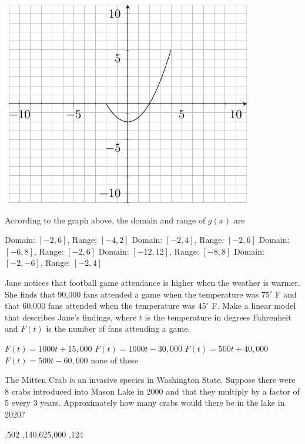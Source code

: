 \documentclass[11pt]{article}
\begin{document}
\begin{questions}
\begin{multiplechoice}{5}
\begin{minipage}{\linewidth}%
\centering
\makebox[\linewidth]{}
\includegraphics{exam1graph2.pdf}
\label{graph2exam1}%
\end{minipage}
According to the graph above, the domain and range of $g(x)$ are
\begin{answers}{2}
\ans Domain: $[-2,6]$, Range: $[-4,2]$
\ans Domain: $[-2,4]$, Range: $[-2,6]$
\ans Domain: $[-6,8]$, Range: $[-2,6]$
\ans Domain: $[-12,12]$, Range: $[-8,8]$
\ans Domain: $[-2,-6]$, Range: $[-2,4]$
\end{answers}



\question Jane notices that football game attendance is higher when the weather is warmer.  She finds that 90,000 fans attended a game when the temperature was $75^\circ$ F and that 60,000 fans attended when the temperature was $45^\circ$ F.  Make a linear model that describes Jane's findings, where $t$ is the temperature in degrees Fahrenheit and $F(t)$ is the number of fans attending a game.
\begin{answers}{3}
\ans $F(t) = 1000t+15,000$
\ans $F(t) = 1000t-30,000$
\ans $F(t) = 500t+40,000$
\ans $F(t) = 500t - 60,000$
\ans none of these
\end{answers}

\question The Mitten Crab is an invasive species in Washington State.  Suppose there were 8 crabs introduced into Mason Lake in 2000 and that they multiply by a factor of 5 every 3 years.  Approximately how many crabs would there be in the lake in 2020?
\begin{answers}{2}
,502
,140,625,000
,124
\end{answers}


\end{multiplechoice}
\end{questions}
\end{document}
